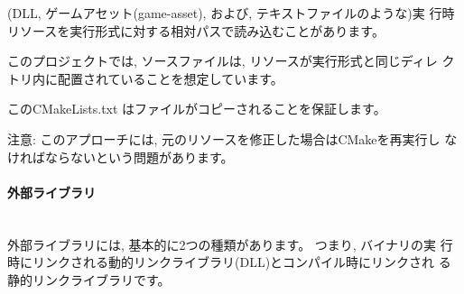 \documentclass[11pt,a4paper,landscape]{ltjsarticle}
\newcommand{\sectiontitle}[1]{\paragraph{#1} \ \\} %
\begin{document}
\begin{multicols}{2}
(DLL, ゲームアセット(game-asset), および, テキストファイルのような)実
行時リソースを実行形式に対する相対パスで読み込むことがあります。

\vspace{\baselineskip} %
\noindent{}

このプロジェクトでは, ソースファイルは, リソースが実行形式と同じディレ
クトリ内に配置されていることを想定しています。



このCMakeLists.txt はファイルがコピーされることを保証します。



注意: このアプローチには, 元のリソースを修正した場合はCMakeを再実行し
なければならないという問題があります。

\sectiontitle{外部ライブラリ}

外部ライブラリには, 基本的に2つの種類があります。 つまり, バイナリの実
行時にリンクされる動的リンクライブラリ(DLL)とコンパイル時にリンクされ
る静的リンクライブラリです。 



\end{multicols}
\end{document}
